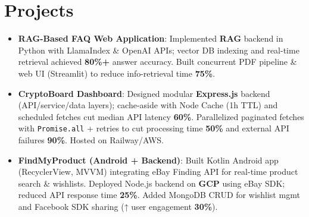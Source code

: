 \documentclass[letterpaper,11pt]{article}
\newcommand{\resumeItem}[2]{\item\small{\textbf{#1}{: #2 \vspace{-2pt}}}}
\newcommand{\resumeSubItem}[2]{\resumeItem{#1}{#2}\vspace{-4pt}}
\newcommand{\resumeSubHeadingListStart}{\begin{itemize}[leftmargin=*]}
\newcommand{\resumeSubHeadingListEnd}{\end{itemize}}
\begin{document}
\section{Projects}
\resumeSubHeadingListStart
  \resumeSubItem{RAG-Based FAQ Web Application}{
    Implemented \textbf{RAG} backend in Python with LlamaIndex \& OpenAI APIs; vector DB indexing and real-time retrieval achieved \textbf{80\%+} answer accuracy. Built concurrent PDF pipeline \& web UI (Streamlit) to reduce info-retrieval time \textbf{75\%}.}
  \resumeSubItem{CryptoBoard Dashboard}{
    Designed modular \textbf{Express.js} backend (API/service/data layers); cache-aside with Node Cache (1h TTL) and scheduled fetches cut median API latency \textbf{60\%}. Parallelized paginated fetches with \texttt{Promise.all} + retries to cut processing time \textbf{50\%} and external API failures \textbf{90\%}. Hosted on Railway/AWS.}
  \resumeSubItem{FindMyProduct (Android + Backend)}{
    Built Kotlin Android app (RecyclerView, MVVM) integrating eBay Finding API for real-time product search \& wishlists. Deployed Node.js backend on \textbf{GCP} using eBay SDK; reduced API response time \textbf{25\%}. Added MongoDB CRUD for wishlist mgmt and Facebook SDK sharing (↑ user engagement \textbf{30\%}).}
\resumeSubHeadingListEnd


\end{document}
